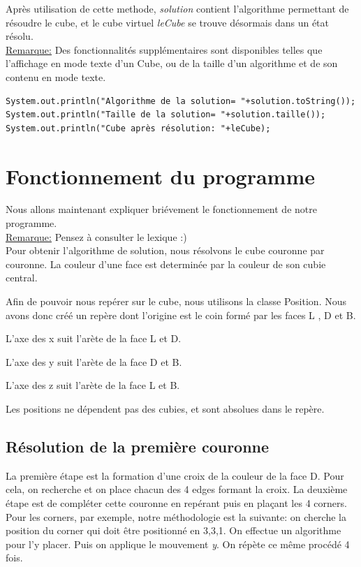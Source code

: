 \documentclass[a4paper,12pt]{article}
\begin{document}
Après utilisation de cette methode, \textit{solution} contient l'algorithme permettant de résoudre le cube, et le cube virtuel \textit{leCube} se trouve désormais dans un état résolu.\\

\underline{Remarque:} Des fonctionnalités supplémentaires sont disponibles telles que l'affichage en mode texte d'un Cube, ou de la taille d'un algorithme et de son contenu en mode texte.

\begin{verbatim}
System.out.println("Algorithme de la solution= "+solution.toString());
System.out.println("Taille de la solution= "+solution.taille());
System.out.println("Cube après résolution: "+leCube);
\end{verbatim}

\section{Fonctionnement du programme}

Nous allons maintenant expliquer briévement le fonctionnement de notre programme.\\

\underline{Remarque:} Pensez à consulter le lexique :)\\


Pour obtenir l'algorithme de solution, nous résolvons le cube couronne par couronne.
La couleur d'une face est determinée par la couleur de son cubie central.

Afin de pouvoir nous repérer sur le cube, nous utilisons la classe Position. Nous avons donc créé un repère dont l'origine est le coin formé par les faces L , D  et B.

L'axe des x suit l'arète de la face L et D.

L'axe des y suit l'arète de la face D et B.

L'axe des z suit l'arète de la face L et B.

Les positions ne dépendent pas des cubies, et sont absolues dans le repère.

\subsection{Résolution de la première couronne}

La première étape est la formation d'une croix de la couleur de la face D. Pour cela, on recherche et on place chacun des 4 edges formant la croix.
La deuxième étape est de compléter cette couronne en repérant puis en plaçant les 4 corners.
Pour les corners, par exemple, notre méthodologie est la suivante: on cherche la position du corner qui doit être positionné en 3,3,1. On effectue un algorithme pour l'y placer. Puis on applique le mouvement \textit{y}. On répète ce même procédé 4 fois.
\end{document}
